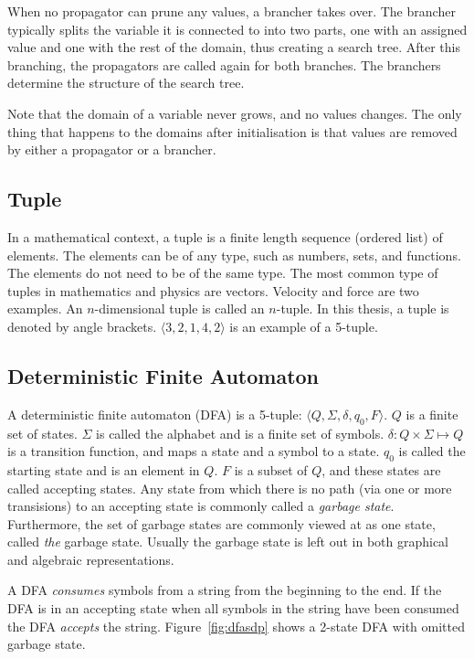 \documentclass[a4paper,11pt]{article}
\begin{document}
When no propagator can prune any values, a brancher takes over. The brancher typically splits the variable it is connected to into two parts, one with an assigned value and one with the rest of the domain, thus creating a search tree. After this branching, the propagators are called again for both branches. The branchers determine the structure of the search tree.

Note that the domain of a variable never grows, and no values changes. The only thing that happens to the domains after initialisation is that values are removed by either a propagator or a brancher.

\subsection{Tuple}
In a mathematical context, a tuple is a finite length sequence (ordered list) of elements. The elements can be of any type, such as numbers, sets, and functions. The elements do not need to be of the same type. The most common type of tuples in mathematics and physics are vectors. Velocity and force are two examples. An $n$-dimensional tuple is called an $n$-tuple. In this thesis, a tuple is denoted by angle brackets. $\langle 3, 2, 1, 4, 2 \rangle$ is an example of a 5-tuple.

\subsection{Deterministic Finite Automaton}
A deterministic finite automaton (DFA) is a 5-tuple: $\langle Q,\Sigma,\delta,q_0, F\rangle$. $Q$ is a finite set of states. $\Sigma$ is called the alphabet and is a finite set of symbols. $\delta : Q \times \Sigma \mapsto Q$  is a transition function, and maps a state and a symbol to a state. $q_0$ is called the starting state and is an element in $Q$. $F$ is a subset of $Q$, and these states are called accepting states. Any state from which there is no path (via one or more transisions) to an accepting state is commonly called a \textit{garbage state}. Furthermore, the set of garbage states are commonly viewed at as one state, called \textit{the} garbage state. Usually the garbage state is left out in both graphical and algebraic representations. 

A DFA \textit{consumes} symbols from a string from the beginning to the end. If the DFA is in an accepting state when all symbols in the string have been consumed the DFA \textit{accepts} the string. Figure~\ref{fig:dfasdp} shows a 2-state DFA with omitted garbage state.
\end{document}

